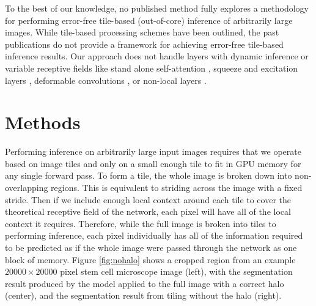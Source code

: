\documentclass[twoside,11pt]{article}
\begin{document}
To the best of our knowledge, no published method fully explores a methodology for performing error-free tile-based (out-of-core) inference of arbitrarily large images. While tile-based processing schemes have been outlined, the past publications do not provide a framework for achieving error-free tile-based inference results. Our approach does not handle layers with dynamic inference or variable receptive fields like stand alone self-attention \citep{Ramachandran2019b}, squeeze and excitation layers \citep{Hu2018}, deformable convolutions \citep{Dai2017}, or non-local layers \citep{Wang2018c}. 


\section{Methods}
\label{methods}

Performing inference on arbitrarily large input images requires that we operate based on image tiles and only on a small enough tile to fit in GPU memory for any single forward pass. To form a tile, the whole image is broken down into non-overlapping regions. This is equivalent to striding across the image with a fixed stride. Then if we include enough local context around each tile to cover the theoretical receptive field of the network, each pixel will have all of the local context it requires. Therefore, while the full image is broken into tiles to performing inference, each pixel individually has all of the information required to be predicted as if the whole image were passed through the network as one block of memory. Figure \ref{fig:nohalo} shows a cropped region from an example $\num{20000} \times \num{20000}$ pixel stem cell microscope image (left), with the segmentation result produced by the model applied to the full image with a correct halo (center), and the segmentation result from tiling without the halo (right). 
\end{document}

